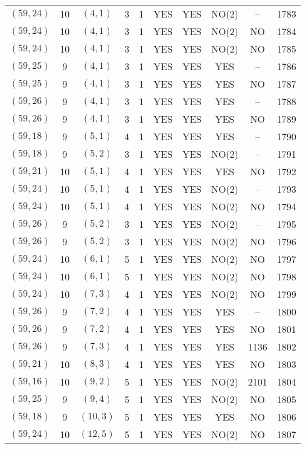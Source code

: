 \begin{longtable}{|c|c|c|c|c|c|c|c|c|c|}
$(59, 24)$ & 10 & $(4, 1)$ & 3 & 1 & YES & YES & NO(2) & -- & 1783\\
$(59, 24)$ & 10 & $(4, 1)$ & 3 & 1 & YES & YES & NO(2) & NO & 1784\\
$(59, 24)$ & 10 & $(4, 1)$ & 3 & 1 & YES & YES & NO(2) & NO & 1785\\
$(59, 25)$ & 9 & $(4, 1)$ & 3 & 1 & YES & YES & YES & -- & 1786\\
$(59, 25)$ & 9 & $(4, 1)$ & 3 & 1 & YES & YES & YES & NO & 1787\\
$(59, 26)$ & 9 & $(4, 1)$ & 3 & 1 & YES & YES & YES & -- & 1788\\
$(59, 26)$ & 9 & $(4, 1)$ & 3 & 1 & YES & YES & YES & NO & 1789\\
$(59, 18)$ & 9 & $(5, 1)$ & 4 & 1 & YES & YES & YES & -- & 1790\\
$(59, 18)$ & 9 & $(5, 2)$ & 3 & 1 & YES & YES & NO(2) & -- & 1791\\
$(59, 21)$ & 10 & $(5, 1)$ & 4 & 1 & YES & YES & YES & NO & 1792\\
$(59, 24)$ & 10 & $(5, 1)$ & 4 & 1 & YES & YES & NO(2) & -- & 1793\\
$(59, 24)$ & 10 & $(5, 1)$ & 4 & 1 & YES & YES & NO(2) & NO & 1794\\
$(59, 26)$ & 9 & $(5, 2)$ & 3 & 1 & YES & YES & NO(2) & -- & 1795\\
$(59, 26)$ & 9 & $(5, 2)$ & 3 & 1 & YES & YES & NO(2) & NO & 1796\\
$(59, 24)$ & 10 & $(6, 1)$ & 5 & 1 & YES & YES & NO(2) & NO & 1797\\
$(59, 24)$ & 10 & $(6, 1)$ & 5 & 1 & YES & YES & NO(2) & NO & 1798\\
$(59, 24)$ & 10 & $(7, 3)$ & 4 & 1 & YES & YES & NO(2) & NO & 1799\\
$(59, 26)$ & 9 & $(7, 2)$ & 4 & 1 & YES & YES & YES & -- & 1800\\
$(59, 26)$ & 9 & $(7, 2)$ & 4 & 1 & YES & YES & YES & NO & 1801\\
$(59, 26)$ & 9 & $(7, 3)$ & 4 & 1 & YES & YES & YES & 1136 & 1802\\
$(59, 21)$ & 10 & $(8, 3)$ & 4 & 1 & YES & YES & YES & NO & 1803\\
$(59, 16)$ & 10 & $(9, 2)$ & 5 & 1 & YES & YES & NO(2) & 2101 & 1804\\
$(59, 25)$ & 9 & $(9, 4)$ & 5 & 1 & YES & YES & NO(2) & NO & 1805\\
$(59, 18)$ & 9 & $(10, 3)$ & 5 & 1 & YES & YES & YES & NO & 1806\\
$(59, 24)$ & 10 & $(12, 5)$ & 5 & 1 & YES & YES & NO(2) & NO & 1807\\

\end{longtable}
